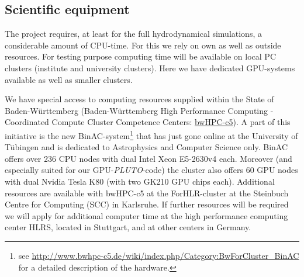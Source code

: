 \documentclass[10pt,fleqn,twoside]{article}
\newcommand{\PLUTO}{{\it PLUTO}}
\begin{document}
\subsection{Scientific equipment}
\label{sec:computers}
The project requires, at least for the full hydrodynamical simulations, a
considerable amount of CPU-time.  For this we rely on own as well as outside
resources.  For testing purpose computing time will be available on local PC
clusters (institute and university clusters).  Here we have dedicated
GPU-systems available as well as smaller clusters.

We have special access to computing resources supplied within the State of
Baden-W\"urttemberg (Baden-W\"urttemberg High Performance Computing -
Coordinated Compute Cluster Competence Centers:
\href{https://www.bwhpc-c5.de}{bwHPC-c5}).  A part of this initiative is the
new BinAC-system\footnote{see
  \url{http://www.bwhpc-c5.de/wiki/index.php/Category:BwForCluster\_BinAC}
  for a detailed description of the hardware.}  that has just gone online at
the University of T\"ubingen and is dedicated to Astrophysics and Computer
Science only.  BinAC offers over 236 CPU nodes with dual Intel Xeon
E5-2630v4 each. Moreover (and especially suited for our GPU-\PLUTO-code) the
cluster also offers 60 GPU nodes with dual Nvidia Tesla K80 (with two GK210
GPU chips each).  Additional resources are available with bwHPC-c5 at the
ForHLR-cluster at the Steinbuch Centre for Computing (SCC) in Karlsruhe.  If
further resources will be required we will apply for additional computer
time at the high performance computing center HLRS, located in Stuttgart,
and at other centers in Germany.



%



\end{document}
